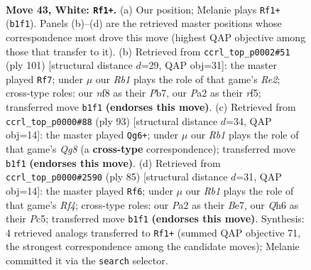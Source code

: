 \documentclass[11pt]{article}
\begin{document}
\clearpage

\begin{figure}[p]\centering
\begin{subfigure}{0.46\textwidth}\centering
\resizebox{\linewidth}{!}{%
\newchessgame
\chessboard[
  setfen={5n2/5k2/7Q/pqp5/8/1P6/P7/1R4K1 w - - 2 43},
  showmover=false,
  pgfstyle=straightmove, color=movearrow, markmove={b1-f1}
]}
\caption{}
\end{subfigure}\hfill
\begin{subfigure}{0.46\textwidth}\centering
\resizebox{\linewidth}{!}{%
\newchessgame
\chessboard[
  setfen={8/1p2r1k1/1Q6/5R2/7p/7P/3q2PK/8 b - - 0 51},
  showmover=false,
  pgfstyle=straightmove, color=movearrow, markmove={e7-f7}
]}
\caption{}
\end{subfigure}
\\[4pt]
\begin{subfigure}{0.46\textwidth}\centering
\resizebox{\linewidth}{!}{%
\newchessgame
\chessboard[
  setfen={8/1Q4pk/p7/P4K2/8/1PP5/8/6q1 b - - 2 47},
  showmover=false,
  pgfstyle=straightmove, color=movearrow, markmove={g1-g6}
]}
\caption{}
\end{subfigure}\hfill
\begin{subfigure}{0.46\textwidth}\centering
\resizebox{\linewidth}{!}{%
\newchessgame
\chessboard[
  setfen={8/4bk2/p7/2p1pr2/4Q3/K7/2P5/8 b - - 4 43},
  showmover=false,
  pgfstyle=straightmove, color=movearrow, markmove={f5-f6}
]}
\caption{}
\end{subfigure}
\caption{\textbf{Move 43, White: \texttt{Rf1+}.} (a) Our position; Melanie plays \texttt{Rf1+} (\texttt{b1f1}). Panels (b)--(d) are the retrieved master positions whose correspondence most drove this move (highest QAP objective among those that transfer to it). (b) Retrieved from \texttt{ccrl\_top\_p0002\#51} (ply 101) [structural distance $d$=29, QAP obj=31]: the master played \texttt{Rf7}; under $\mu$ our \emph{Rb1} plays the role of that game's \emph{Re2}; cross-type roles: our \emph{n}f8 as their \emph{P}b7, our \emph{P}a2 as their \emph{r}f5; transferred move \texttt{b1f1} \textbf{(endorses this move)}. (c) Retrieved from \texttt{ccrl\_top\_p0000\#88} (ply 93) [structural distance $d$=34, QAP obj=14]: the master played \texttt{Qg6+}; under $\mu$ our \emph{Rb1} plays the role of that game's \emph{Qg8} (a \textbf{cross-type} correspondence); transferred move \texttt{b1f1} \textbf{(endorses this move)}. (d) Retrieved from \texttt{ccrl\_top\_p0000\#2590} (ply 85) [structural distance $d$=31, QAP obj=14]: the master played \texttt{Rf6}; under $\mu$ our \emph{Rb1} plays the role of that game's \emph{Rf4}; cross-type roles: our \emph{P}a2 as their \emph{B}e7, our \emph{Q}h6 as their \emph{P}c5; transferred move \texttt{b1f1} \textbf{(endorses this move)}. Synthesis: 4 retrieved analogs transferred to \texttt{Rf1+} (summed QAP objective 71, the strongest correspondence among the candidate moves); Melanie committed it via the \texttt{search} selector.}
\label{fig:thought-m84}
\end{figure}
\end{document}
